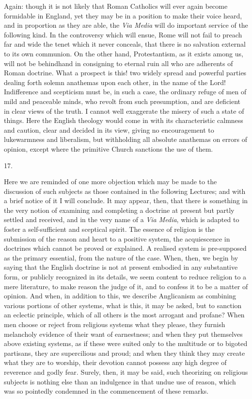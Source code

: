 Again: though it is not likely that Roman Catholics will ever again
become formidable in England, yet they may be in a position to make
their voice heard, and in proportion as they are able, the \emph{Via
Media} will do important service of the following kind. In the
controversy which will ensue, Rome will not fail to preach far and
wide the tenet which it never conceals, that there is no salvation
external to its own communion. On the other hand, Protestantism, as it
exists among us, will not be behindhand in consigning to eternal ruin
all who are adherents of Roman doctrine. What a prospect is this! two
widely spread and powerful parties dealing forth solemn anathemas upon
each other, in the name of the Lord! Indifference and scepticism must
be, in such a case, the ordinary refuge of men of mild and peaceable
minds, who revolt from such presumption, and are deficient in clear
views of the truth. I cannot well exaggerate the misery of such a
state of things. Here the English theology would come in with its
characteristic calmness and caution, clear and decided in its view,
giving no encouragement to lukewarmness and liberalism, but
withholding all absolute anathemas on errors of opinion, except where
the primitive Church sanctions the use of them.

17.

Here we are reminded of one more objection which may be made to the
discussion of such subjects as those contained in the following
Lectures; and with a brief notice of it I will conclude. It may
appear, then, that there is something in the very notion of examining
and completing a doctrine at present but partly settled and received,
and in the very name of a \emph{Via Media}, which is adapted to foster
a self-sufficient and sceptical spirit. The essence of religion is the
submission of the reason and heart to a positive system, the
acquiescence in doctrines which cannot be proved or explained. A
realised system is pre-supposed as the primary essential, from the
nature of the case. When, then, we begin by saying that the English
doctrine is not at present embodied in any substantive form, or
publicly recognized in its details, we seem content to reduce religion
to a mere literature, to make reason the judge of it, and to confess
it to be a matter of opinion. And when, in addition to this, we
describe Anglicanism as combining various portions of other systems,
what is this, it may be asked, but to sanction an eclectic principle,
which of all others is the most arrogant and profane? When men choose
or reject from religious systems what they please, they furnish
melancholy evidence of their want of earnestness; and when they put
themselves above existing systems, as if these were suited only to the
multitude or to bigoted partisans, they are supercilious and proud;
and when they think they may create what they are to worship, their
devotion cannot possess any high degree of reverence and godly fear.
Surely, then, it may be said, such theorizing on religious subjects is
nothing else than an indulgence in that undue use of reason, which was
so pointedly condemned in the commencement of these remarks.

